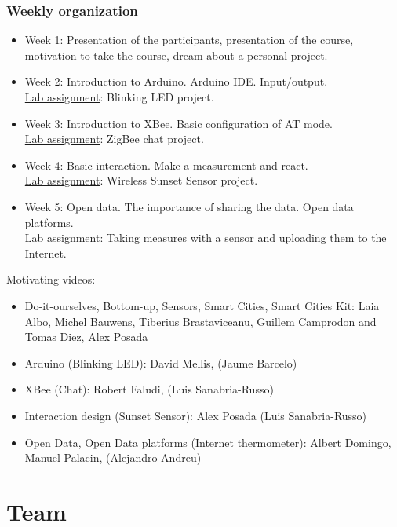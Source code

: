 \documentclass[a4paper,oneside]{book}   %
\begin{document}
\subsection{Weekly organization}
\begin{itemize}
\item Week 1: Presentation of the participants, presentation of the course, motivation to take the course, dream about a personal project.
\item Week 2: Introduction to Arduino. Arduino IDE. Input/output. \\\underline{Lab assignment}: Blinking LED project.
\item Week 3: Introduction to XBee. Basic configuration of AT mode. \\\underline{Lab assignment}: ZigBee chat project.
\item Week 4: Basic interaction. Make a measurement and react. \\\underline{Lab assignment}: Wireless Sunset Sensor project.
\item Week 5: Open data. The importance of sharing the data. Open data platforms. \\\underline{Lab assignment}: Taking measures with a sensor and uploading them to the Internet.
\end{itemize}

Motivating videos:
\begin{itemize}
\item Do-it-ourselves, Bottom-up, Sensors, Smart Cities, Smart Cities Kit:
Laia Albo, Michel Bauwens, Tiberius Brastaviceanu, Guillem Camprodon and Tomas Diez, Alex Posada

\item Arduino (Blinking LED):
David Mellis, (Jaume Barcelo)

\item XBee (Chat):
Robert Faludi, (Luis Sanabria-Russo)

\item Interaction design (Sunset Sensor):
Alex Posada (Luis Sanabria-Russo)

\item Open Data, Open Data platforms (Internet thermometer):
Albert Domingo, Manuel Palacin, (Alejandro Andreu)
\end{itemize}



\chapter{Team}
\end{document}

